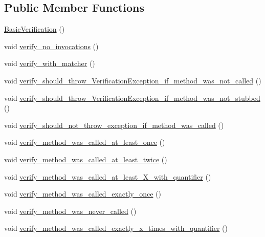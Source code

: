\subsection*{Public Member Functions}
\begin{DoxyCompactItemize}
\item 
\mbox{\hyperlink{structBasicVerification_af193b84dea6587c7da6acb52a802a04b}{Basic\+Verification}} ()
\item 
void \mbox{\hyperlink{structBasicVerification_a6ea28b580177d5ef05b56032ecf3438f}{verify\+\_\+no\+\_\+invocations}} ()
\item 
void \mbox{\hyperlink{structBasicVerification_afb7e5f549e16d9eae222cd85dd9777aa}{verify\+\_\+with\+\_\+matcher}} ()
\item 
void \mbox{\hyperlink{structBasicVerification_af359ac8ac1fa71b858492880e6422807}{verify\+\_\+should\+\_\+throw\+\_\+\+Verification\+Exception\+\_\+if\+\_\+method\+\_\+was\+\_\+not\+\_\+called}} ()
\item 
void \mbox{\hyperlink{structBasicVerification_a6bcd1912cf2f5c19d62957836259e023}{verify\+\_\+should\+\_\+throw\+\_\+\+Verification\+Exception\+\_\+if\+\_\+method\+\_\+was\+\_\+not\+\_\+stubbed}} ()
\item 
void \mbox{\hyperlink{structBasicVerification_ae7404d5a94cef94a356b5e377fa1ebce}{verify\+\_\+should\+\_\+not\+\_\+throw\+\_\+exception\+\_\+if\+\_\+method\+\_\+was\+\_\+called}} ()
\item 
void \mbox{\hyperlink{structBasicVerification_a1276f5fbce9f57821f1f818e9a765561}{verify\+\_\+method\+\_\+was\+\_\+called\+\_\+at\+\_\+least\+\_\+once}} ()
\item 
void \mbox{\hyperlink{structBasicVerification_af62788e316baa5f7d82bf87666fd7305}{verify\+\_\+method\+\_\+was\+\_\+called\+\_\+at\+\_\+least\+\_\+twice}} ()
\item 
void \mbox{\hyperlink{structBasicVerification_a96d45a82ee47900b0da6a435c3b41f9f}{verify\+\_\+method\+\_\+was\+\_\+called\+\_\+at\+\_\+least\+\_\+\+X\+\_\+with\+\_\+quantifier}} ()
\item 
void \mbox{\hyperlink{structBasicVerification_a7505ffa247b4e12bd4d2d571d1996a29}{verify\+\_\+method\+\_\+was\+\_\+called\+\_\+exactly\+\_\+once}} ()
\item 
void \mbox{\hyperlink{structBasicVerification_af8dc55dd6126768d8faca2a71870f767}{verify\+\_\+method\+\_\+was\+\_\+never\+\_\+called}} ()
\item 
void \mbox{\hyperlink{structBasicVerification_ab5d31dd5f8ddaa9e6262087e835f0d73}{verify\+\_\+method\+\_\+was\+\_\+called\+\_\+exactly\+\_\+x\+\_\+times\+\_\+with\+\_\+quantifier}} ()

\end{DoxyCompactItemize}
